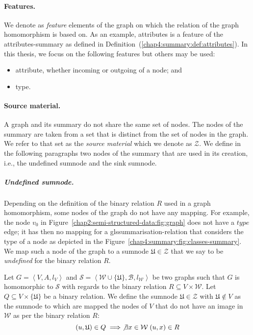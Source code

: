 \paragraph{Features.}

We denote as \emph{feature} elements of the graph on which the relation of the graph homomorphism is based on. As an example, \gls{attributes} is a feature of the \gls{attributes-summary} as defined in Definition~(\ref{chap4:summary:def:attributes}). In this thesis, we focus on the following features but others may be used:
\begin{itemize}
\item attribute, whether incoming or outgoing of a node; and
\item type.
\end{itemize}

\paragraph{Source material.}

A graph and its summary do not share the same set of nodes. The nodes of the summary are taken from a set that is distinct from the set of nodes in the graph. We refer to that set as the \emph{source material} which we denote as $\mathcal{Z}$. We define in the following paragraphs two nodes of the summary that are used in its creation, i.e., the undefined sumnode and the sink sumnode.

\subparagraph{Undefined sumnode.}
\label{sec:undefined-sumnode}

Depending on the definition of the binary relation $R$ used in a graph homomorphism, some nodes of the graph do not have any mapping. For example, the node $v_0$ in Figure~\ref{chap2:semi-structured-data:fig:graph} does not have a $type$ edge; it has then no mapping for a gls{summarisation-relation} that considers the type of a node as depicted in the Figure~\ref{chap4:summary:fig:classes-summary}.
We map such a node of the graph to a sumnode $\mathfrak{U} \in \mathcal{Z}$ that we say to be \emph{undefined} for the binary relation $R$.

\begin{definition}
Let $G=\left\langle V, A, l_V \right\rangle$ and $\mathcal{S}=\left\langle \mathcal{W} \cup \{ \mathfrak{U} \}, \mathcal{B}, l_\mathcal{W} \right\rangle$ be two graphs such that $G$ is homomorphic to $\mathcal{S}$ with regards to the binary relation $R \subseteq V \times \mathcal{W}$.
Let $Q \subseteq V \times \{ \mathfrak{U} \}$ be a binary relation.
We define the sumnode $\mathfrak{U} \in \mathcal{Z}$ with $\mathfrak{U} \not \in V$ as the sumnode to which are mapped the nodes of $V$ that do not have an image in $\mathcal{W}$ as per the binary relation $R$:
$$
(u, \mathfrak{U}) \in Q \implies \not \exists x \in \mathcal{W}\; (u, x) \in R
$$
\end{definition}

